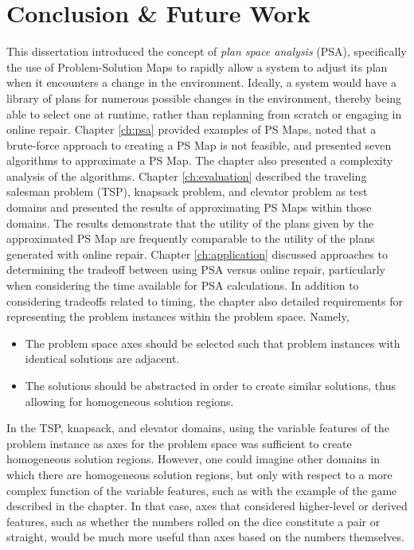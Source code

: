 \chapter{Conclusion \& Future Work}
\thispagestyle{plain}

\label{ch:future}


This dissertation introduced the concept of \textit{plan space analysis} (PSA), specifically the use of Problem-Solution Maps to rapidly allow a system to adjust its plan when it encounters a change in the environment.  Ideally, a system would have a library of plans for numerous possible changes in the environment, thereby being able to select one at runtime, rather than replanning from scratch or engaging in online repair.  Chapter \ref{ch:psa} provided  examples of PS Maps, noted that a brute-force approach to creating a PS Map is not feasible, and presented seven algorithms to approximate a PS Map.  The chapter also presented a complexity analysis of the algorithms.  Chapter \ref{ch:evaluation} described the traveling salesman problem (TSP), knapsack problem, and elevator problem as test domains and presented the results of approximating PS Maps within those domains.  The results demonstrate that the utility of the plans given by the approximated PS Map are frequently comparable to the utility of the plans generated with online repair.  Chapter \ref{ch:application} discussed approaches to determining the tradeoff between using PSA versus online repair, particularly when considering the time available for PSA calculations.  In addition to considering tradeoffs related to timing, the chapter also detailed requirements for representing the problem instances within the problem space.  Namely,
\begin{itemize}
\item The problem space axes should be selected such that problem instances with identical solutions are adjacent.
\item The solutions should be  abstracted in order to create similar solutions, thus allowing for homogeneous solution regions.
\end{itemize}

In the TSP, knapsack, and elevator domains, using the variable features of the problem instance as axes for the problem space was sufficient to create homogeneous solution regions.   However, one could imagine other domains in which there are homogeneous solution regions, but  only with respect to a more complex function of the variable features, such as with the example of the game described in the chapter.  In that case, axes that considered higher-level or derived features, such as whether the numbers rolled on the dice constitute a pair or straight, would be much more useful than axes based on the numbers themselves. 


